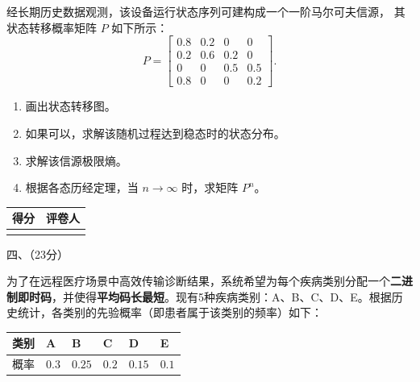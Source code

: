 \documentclass[UTF8,a4paper,12pt]{ctexart}
\begin{document}
经长期历史数据观测，该设备运行状态序列可建构成一个一阶马尔可夫信源，
其状态转移概率矩阵 $P$ 如下所示：
\[
P=
\begin{bmatrix}
0.8 & 0.2 & 0   & 0   \\
0.2 & 0.6 & 0.2 & 0   \\
0   & 0   & 0.5 & 0.5 \\
0.8 & 0   & 0   & 0.2
\end{bmatrix}.
\]

\begin{enumerate}[label=\arabic*., leftmargin=2.2em]
    \item 画出状态转移图。

    \item 如果可以，求解该随机过程达到稳态时的状态分布。

    \item 求解该信源极限熵。

    \item 根据各态历经定理，当 $n\to\infty$ 时，求矩阵 $P^n$。
\end{enumerate}

\newpage

\vspace{2.8em}

\noindent
\begin{minipage}[t]{0.25\textwidth}
\renewcommand{\arraystretch}{1.5}
\begin{tabular}{|C{1.5cm}|C{2.3cm}|}
\hline
得分 & 评卷人 \\
\hline
\rule{0pt}{0.8cm}&  \\
\hline
\end{tabular}
\end{minipage}
\begin{minipage}[t]{0.72\textwidth}
\vspace{1.0cm}
\begin{center}
{\heiti 四、（23分）}
\end{center}
\end{minipage}

\vspace{1.2em}

\noindent
为了在远程医疗场景中高效传输诊断结果，系统希望为每个疾病类别分配一个\textbf{二进制即时码}，并使得\textbf{平均码长最短}。现有5种疾病类别：A、B、C、D、E。根据历史统计，各类别的先验概率（即患者属于该类别的频率）如下：

\begin{center}
\renewcommand{\arraystretch}{1.5}
\begin{tabular}{|C{2.3cm}|C{2.3cm}|C{2.3cm}|C{2.3cm}|C{2.3cm}|C{2.3cm}|}
\hline
类别 & A & B & C & D & E \\
\hline
概率 & $0.3$ & $0.25$ & $0.2$ & $0.15$ & $0.1$ \\
\hline
\end{tabular}
\end{center}
\end{document}
